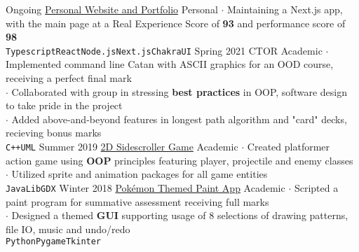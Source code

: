 \documentclass[8pt]{developercv} %
\begin{document}

\begin{minipage}[t]{\textwidth}
	\vspace{-\baselineskip} %

	\begin{entrylist}
		\entry
			{Ongoing}
			{\href{https://henryhu.dev}{Personal Website and Portfolio}}
			{Personal}
			{
				$\cdot$ Maintaining a Next.js app, with the main page at a Real Experience Score of \textbf{93} and performance score of \textbf{98}\\
				\texttt{Typescript}\slashsep\texttt{React}\slashsep\texttt{Node.js}\slashsep\texttt{Next.js}\slashsep\texttt{ChakraUI}
			}
		\entry
			{Spring 2021}
			{CTOR}
			{Academic}
			{
				$\cdot$ Implemented command line Catan with ASCII graphics for an OOD course, receiving a perfect final mark\\
				$\cdot$ Collaborated with group in stressing \textbf{best practices} in OOP, software design to take pride in the project\\
				$\cdot$ Added above-and-beyond features in longest path algorithm and "card" decks, recieving bonus marks \\
				\texttt{C++}\slashsep\texttt{UML}
			}
		\entry
			{Summer 2019}
			{\href{https://youtu.be/3za3L2o1PVA}{2D Sidescroller Game}}
			{Academic}
			{
				$\cdot$ Created platformer action game using \textbf{OOP} principles featuring player, projectile and enemy classes \\
				$\cdot$ Utilized sprite and animation packages for all game entities \\
				\texttt{Java}\slashsep\texttt{LibGDX}
			}
		\entry
			{Winter 2018}
			{\href{https://youtu.be/EFxnTDqU5nU}{Pokémon Themed Paint App}}
			{Academic}
			{
				$\cdot$ Scripted a paint program for summative assessment receiving full marks \\
				$\cdot$ Designed a themed \textbf{GUI} supporting usage of 8 selections of drawing patterns, file IO, music and undo/redo \\
				\texttt{Python}\slashsep\texttt{Pygame}\slashsep\texttt{Tkinter}
			}
	\end{entrylist}
\end{minipage}

\end{document}

